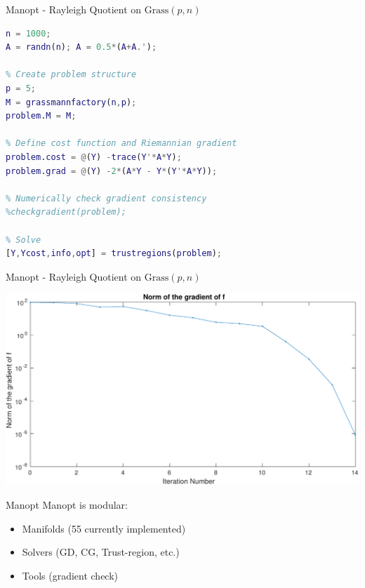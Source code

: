 \documentclass[xcolor=dvipsnames,t]{beamer} %
\begin{document}
\begin{frame}[fragile]{Manopt - Rayleigh Quotient on $\mathrm{Grass}(p,n)$}
\begin{lstlisting}[language=Matlab,escapechar=!]
% Generate symmetric matrix
n = 1000;
A = randn(n); A = 0.5*(A+A.');

% Create problem structure
p = 5;
M = grassmannfactory(n,p);
problem.M = M;

% Define cost function and Riemannian gradient
problem.cost = @(Y) -trace(Y'*A*Y);
problem.grad = @(Y) -2*(A*Y - Y*(Y'*A*Y));

% Numerically check gradient consistency
%checkgradient(problem);

% Solve
[Y,Ycost,info,opt] = trustregions(problem);
\end{lstlisting}
\end{frame}

\begin{frame}[fragile]{Manopt - Rayleigh Quotient on $\mathrm{Grass}(p,n)$}
   \begin{center}
      \includegraphics[width=\textwidth]{figures/rayleigh_grassmann_gradnorm.pdf}
   \end{center}
\end{frame}

\begin{frame}{Manopt}
   Manopt is modular:
   \begin{itemize}
      \item Manifolds (55 currently implemented)
      \item Solvers (GD, CG, Trust-region, etc.)
      \item Tools (gradient check)
   \end{itemize}
\end{frame}

\end{document}
